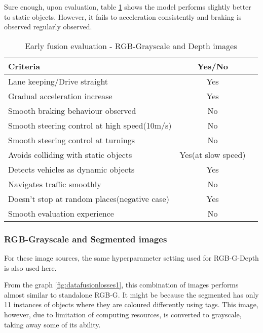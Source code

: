 Sure enough, upon evaluation, table \ref{table:earlyfusionrgbdepth} shows the model
performs slightly better to static objects. However, it fails to acceleration consistently
and braking is observed regularly observed.
\begin{table}[!ht]
    \centering
\begin{tabular}{lcc}
    \toprule
    Criteria  & Yes/No  \\\midrule
    Lane keeping/Drive straight  & Yes  \\
    Gradual acceleration increase  & Yes\\
    Smooth braking behaviour observed & No \\
    Smooth steering control at high speed(10m/s) & No \\
    Smooth steering control at turnings & No\\
    Avoids colliding with static objects & Yes(at slow speed) \\
    Detects vehicles as dynamic objects & Yes \\
    Navigates traffic smoothly & No\\
    Doesn't stop at random places(negative case) & Yes \\
    Smooth evaluation experience & No \\\bottomrule
\end{tabular}
\caption{Early fusion evaluation - RGB-Grayscale and Depth images}
\label{table:earlyfusionrgbdepth}
\end{table}


\subsubsection*{RGB-Grayscale and Segmented images}
For these image sources, the same hyperparameter setting used for RGB-G-Depth is also used
here.

From the graph \ref{fig:datafusionlosses1}, this combination of images performs almost
similar to standalone RGB-G. It might be because the segmented has only 11 instances of
objects where they are coloured differently using tags. This image, however, due to
limitation of computing resources, is converted to grayscale, taking away some of its
ability.

